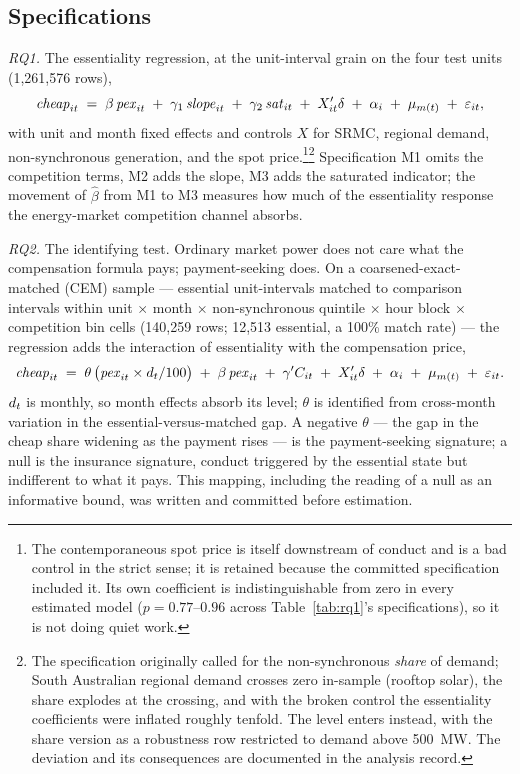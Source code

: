\subsection{Specifications}

\emph{RQ1.} The essentiality regression, at the unit-interval grain on the
four test units (1,261,576 rows),
\begin{equation}\label{eq:rq1}
\mathit{cheap}_{it} \;=\; \beta\,\mathit{pex}_{it} \;+\; \gamma_{1}\,\mathit{slope}_{it}
\;+\; \gamma_{2}\,\mathit{sat}_{it} \;+\; X_{it}'\delta \;+\; \alpha_{i}
\;+\; \mu_{m(t)} \;+\; \varepsilon_{it},
\end{equation}
with unit and month fixed effects and controls $X$ for SRMC, regional demand,
non-synchronous generation, and the spot price.\footnote{The contemporaneous
spot price is itself downstream of conduct and is a bad control in the
strict sense; it is retained because the committed specification included
it. Its own coefficient is indistinguishable from zero in every estimated
model ($p=0.77$--$0.96$ across Table~\ref{tab:rq1}'s specifications), so it
is not doing quiet work.}\footnote{The specification
originally called for the non-synchronous \emph{share} of demand; South
Australian regional demand crosses zero in-sample (rooftop solar), the share
explodes at the crossing, and with the broken control the essentiality
coefficients were inflated roughly tenfold. The level enters instead, with the
share version as a robustness row restricted to demand above 500~MW. The
deviation and its consequences are documented in the analysis record.}
Specification M1 omits the competition terms, M2 adds the slope, M3 adds the
saturated indicator; the movement of $\hat\beta$ from M1 to M3 measures how
much of the essentiality response the energy-market competition channel
absorbs.

\emph{RQ2.} The identifying test. Ordinary market power does not care what
the compensation formula pays; payment-seeking does. On a
coarsened-exact-matched (CEM) sample --- essential unit-intervals matched to
comparison intervals within unit $\times$ month $\times$ non-synchronous
quintile $\times$ hour block $\times$ competition bin cells (140,259 rows;
12,513 essential, a 100\% match rate) --- the regression adds the interaction
of essentiality with the compensation price,
\begin{equation}\label{eq:rq2}
\mathit{cheap}_{it} \;=\; \theta\,\bigl(\mathit{pex}_{it}\times d_t/100\bigr) \;+\;
\beta\,\mathit{pex}_{it} \;+\; \gamma' C_{it} \;+\; X_{it}'\delta \;+\; \alpha_{i}
\;+\; \mu_{m(t)} \;+\; \varepsilon_{it}.
\end{equation}
$d_t$ is monthly, so month effects absorb its level; $\theta$ is identified
from cross-month variation in the essential-versus-matched gap. A negative
$\theta$ --- the gap in the cheap share widening as the payment rises --- is
the payment-seeking signature; a null is the insurance signature, conduct
triggered by the essential state but indifferent to what it pays. This mapping,
including the reading of a null as an informative bound, was written and
committed before estimation.

